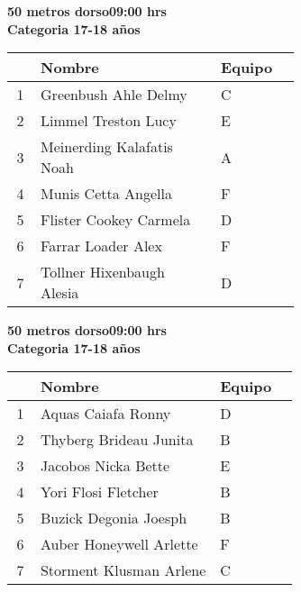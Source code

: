 \begin{minipage}{0.95\linewidth}\vspace{0.5cm} 
\begin{flushleft}
\textbf{
\hspace{-0.15cm}50 metros dorso\hspace{1.5cm}09:00 hrs \\Categoria 17-18 años}\vspace{-0.2cm} 
\end{flushleft}
\begin{tabular}{cp{0.63\linewidth}l}
\hline
& \textbf{Nombre} & \textbf{Equipo} \\ \hline
1 & Greenbush Ahle Delmy & C \\ 
2 & Limmel Treston Lucy & E \\ 
3 & Meinerding Kalafatis Noah & A \\ 
4 & Munis Cetta Angella & F \\ 
5 & Flister Cookey Carmela & D \\ 
6 & Farrar Loader Alex & F \\ 
7 & Tollner Hixenbaugh Alesia & D \\ 
\end{tabular}
\end{minipage}
\begin{minipage}{0.95\linewidth}\vspace{0.5cm} 
\begin{flushleft}
\textbf{
\hspace{-0.15cm}50 metros dorso\hspace{1.5cm}09:00 hrs \\Categoria 17-18 años}\vspace{-0.2cm} 
\end{flushleft}
\begin{tabular}{cp{0.63\linewidth}l}
\hline
& \textbf{Nombre} & \textbf{Equipo} \\ \hline
1 & Aquas Caiafa Ronny & D \\ 
2 & Thyberg Brideau Junita & B \\ 
3 & Jacobos Nicka Bette & E \\ 
4 & Yori Flosi Fletcher & B \\ 
5 & Buzick Degonia Joesph & B \\ 
6 & Auber Honeywell Arlette & F \\ 
7 & Storment Klusman Arlene & C \\ 
\end{tabular}
\end{minipage}

